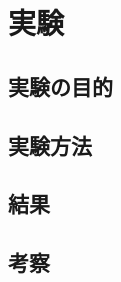 \chapter{実験}
\label{chap:exeperiment}


\section{実験の目的}
\label{sec:purpose}


\section{実験方法}
\label{sec:method}


\section{結果}
\label{sec:result}

\section{考察}
\label{sec:discussion}



